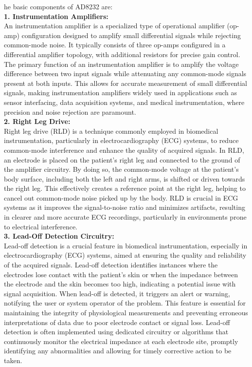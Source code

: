 he basic components of AD8232 are:
\\
\textbf{1. Instrumentation Amplifiers:}
\\
An instrumentation amplifier is a specialized type of operational amplifier\cite{dimas2022classification} (op-amp) configuration designed to amplify small differential signals while rejecting common-mode noise. It typically consists of three op-amps configured in a differential amplifier topology, with additional resistors for precise gain control. The primary function of an instrumentation amplifier is to amplify the voltage difference between two input signals while attenuating any common-mode signals present at both inputs. This allows for accurate measurement of small differential signals, making instrumentation amplifiers widely used in applications such as sensor interfacing, data acquisition systems, and medical instrumentation, where precision and noise rejection are paramount.
\\
\textbf{2. Right Leg Drive: }
\\
Right leg drive (RLD) is a technique commonly employed in biomedical instrumentation, particularly in electrocardiography\cite{noor2021predicting} (ECG) systems, to reduce common-mode interference and enhance the quality of acquired signals. In RLD, an electrode is placed on the patient's right leg and connected to the ground of the amplifier circuitry. By doing so, the common-mode voltage at the patient's body surface, including both the left and right arms, is shifted or driven towards the right leg. This effectively creates a reference point at the right leg, helping to cancel out common-mode noise picked up by the body. RLD is crucial in ECG systems as it improves the signal-to-noise ratio and minimizes artifacts, resulting in clearer and more accurate ECG recordings, particularly in environments prone to electrical interference.
\\
\textbf{3. Lead-Off Detection Circuitry:}
\\
Lead-off detection is a crucial feature in biomedical instrumentation, especially in electrocardiography (ECG) systems, aimed at ensuring the quality and reliability of the acquired signals. Lead-off detection identifies instances where the electrodes lose contact with the patient's skin or when the impedance between the electrode and the skin becomes too high, indicating a potential issue with signal acquisition. When lead-off is detected, it triggers an alert or warning, notifying the user or system operator of the problem. This feature is essential for maintaining the integrity of physiological measurements and preventing erroneous interpretations of data due to poor electrode contact or signal loss. Lead-off detection is often implemented using dedicated circuitry or algorithms that continuously monitor the electrical impedance at each electrode site, promptly identifying any abnormalities and allowing for timely corrective action to be taken.
